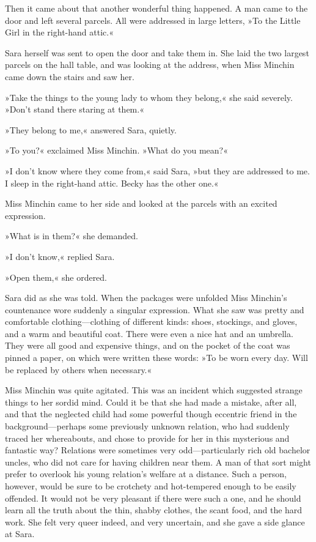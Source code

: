 Then it came about that another wonderful thing happened. A man came to the door and left several parcels. All were addressed in large letters, »To the Little Girl in the right-hand attic.«

Sara herself was sent to open the door and take them in. She laid the two largest parcels on the hall table, and was looking at the address, when Miss Minchin came down the stairs and saw her.

»Take the things to the young lady to whom they belong,« she said severely. »Don't stand there staring at them.«

»They belong to me,« answered Sara, quietly.

»To you?« exclaimed Miss Minchin. »What do you mean?«

»I don't know where they come from,« said Sara, »but they are addressed to me. I sleep in the right-hand attic. Becky has the other one.«

Miss Minchin came to her side and looked at the parcels with an excited expression.

»What is in them?« she demanded.

»I don't know,« replied Sara.

»Open them,« she ordered.

Sara did as she was told. When the packages were unfolded Miss Minchin's countenance wore suddenly a singular expression. What she saw was pretty and comfortable clothing—clothing of different kinds: shoes, stockings, and gloves, and a warm and beautiful coat. There were even a nice hat and an umbrella. They were all good and expensive things, and on the pocket of the coat was pinned a paper, on which were written these words: »To be worn every day. Will be replaced by others when necessary.«

Miss Minchin was quite agitated. This was an incident which suggested strange things to her sordid mind. Could it be that she had made a mistake, after all, and that the neglected child had some powerful though eccentric friend in the background—perhaps some previously unknown relation, who had suddenly traced her whereabouts, and chose to provide for her in this mysterious and fantastic way? Relations were sometimes very odd—particularly rich old bachelor uncles, who did not care for having children near them. A man of that sort might prefer to overlook his young relation's welfare at a distance. Such a person, however, would be sure to be crotchety and hot-tempered enough to be easily offended. It would not be very pleasant if there were such a one, and he should learn all the truth about the thin, shabby clothes, the scant food, and the hard work. She felt very queer indeed, and very uncertain, and she gave a side glance at Sara.

